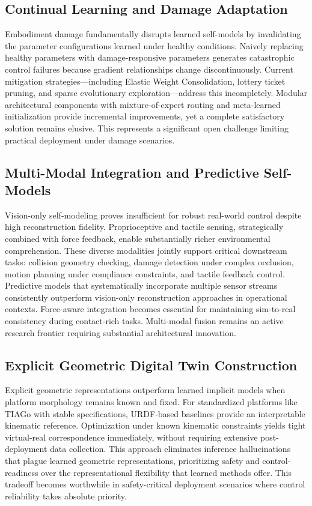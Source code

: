 ﻿\documentclass[11pt,a4paper]{article}
\begin{document}
\subsection{Continual Learning and Damage Adaptation}

Embodiment damage fundamentally disrupts learned self-models by invalidating the parameter configurations learned under healthy conditions. Naively replacing healthy parameters with damage-responsive parameters generates catastrophic control failures because gradient relationships change discontinuously. Current mitigation strategies—including Elastic Weight Consolidation, lottery ticket pruning, and sparse evolutionary exploration—address this incompletely. Modular architectural components with mixture-of-expert routing and meta-learned initialization provide incremental improvements, yet a complete satisfactory solution remains elusive. This represents a significant open challenge limiting practical deployment under damage scenarios.

\subsection{Multi-Modal Integration and Predictive Self-Models}

Vision-only self-modeling proves insufficient for robust real-world control despite high reconstruction fidelity. Proprioceptive and tactile sensing, strategically combined with force feedback, enable substantially richer environmental comprehension. These diverse modalities jointly support critical downstream tasks: collision geometry checking, damage detection under complex occlusion, motion planning under compliance constraints, and tactile feedback control. Predictive models that systematically incorporate multiple sensor streams consistently outperform vision-only reconstruction approaches in operational contexts. Force-aware integration becomes essential for maintaining sim-to-real consistency during contact-rich tasks. Multi-modal fusion remains an active research frontier requiring substantial architectural innovation.

\subsection{Explicit Geometric Digital Twin Construction}

Explicit geometric representations outperform learned implicit models when platform morphology remains known and fixed. For standardized platforms like TIAGo with stable specifications, URDF-based baselines provide an interpretable kinematic reference. Optimization under known kinematic constraints yields tight virtual-real correspondence immediately, without requiring extensive post-deployment data collection. This approach eliminates inference hallucinations that plague learned geometric representations, prioritizing safety and control-readiness over the representational flexibility that learned methods offer. This tradeoff becomes worthwhile in safety-critical deployment scenarios where control reliability takes absolute priority.
\end{document}
